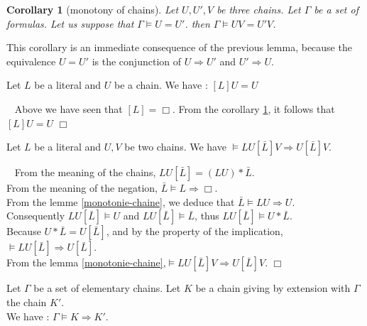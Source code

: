 \documentclass{article}
\newtheorem{corollaire}[theoreme]{Corollary}
\newenvironment{preuve}{\noindent {\em Proof :}\ }{{\hfill
    $\Box$}\vspace{.5pc}} \newcommand{\sg}{\!\!<\!\!}
\begin{document}
\begin{corollaire}[monotony of chains]\label{monotonie-chaine-egal}
Let $U,U',V$ be three chains. Let $\Gamma$ be a set of formulas.
Let us suppose that $\Gamma \models U= U'$. then $\Gamma \models UV = U'V$.
\end{corollaire}

This corollary is an immediate consequence of the previous lemma, because the equivalence $U = U'$ is the
conjunction of 
 $U \Rightarrow U'$ and $U' \Rightarrow U$.


\begin{lemme}\label{coherence-enlevement}
Let $L$ be a literal and $U$ be a chain. We have : $[L]U = U$
\end{lemme}

\begin{preuve}
Above we have seen that $[L]=\Box$. From the corollary \ref{monotonie-chaine-egal}, it follows that $[L]U=U$
\end{preuve}

\begin{lemme}\label{coherence-reduction}
Let $L$ be a literal and $U, V$ be two chains. We have $\models LU[\bar L]V \Rightarrow U[\bar L]V$.
\end{lemme}

\begin{preuve}
From the meaning of the chains, $LU[\bar L] = (LU)*\bar L$.\\
From the meaning of the negation, $\bar L \models L \Rightarrow \Box$.\\
From the lemme \ref{monotonie-chaine}, we deduce that $\bar L \models LU \Rightarrow U$.\\
Consequently $LU[\bar L]  \models U$ and $LU[\bar L] \models \bar L$, thus $LU[\bar L]\models U*\bar L$.\\
Because $U*\bar L =U[\bar L]$, and by the property of the implication, $\models LU[\bar L] \Rightarrow U[\bar L]$.\\
From the lemma \ref{monotonie-chaine},$\models LU[\bar L]V \Rightarrow U[\bar L]V$.
\end{preuve}




\begin{lemme}\label{coherence-expansion}
Let $\Gamma$ be a set of elementary chains. Let $K$ be a chain giving by extension with $\Gamma$ the chain $K'$.\\
We have : $\Gamma \models K \Rightarrow K'$.
\end{lemme}
\end{document}
